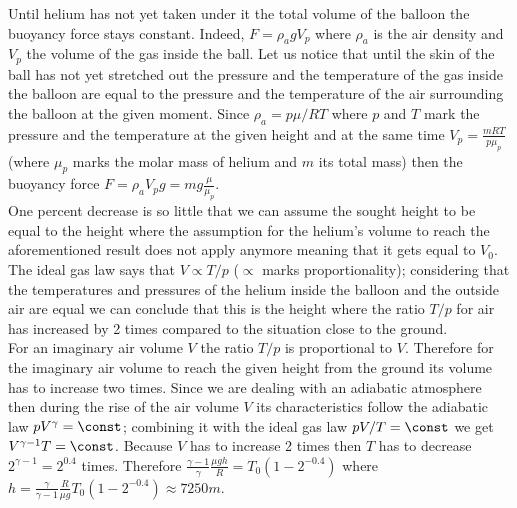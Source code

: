 \documentclass[11pt]{article}
\begin{document}

\solueng
Until helium has not yet taken under it the total volume of the balloon the buoyancy force stays constant. Indeed, $F=\rho_a g V_p$ where $\rho_a$ is the air density and $V_p$ the volume of the gas inside the ball. Let us notice that until the skin of the ball has not yet stretched out the pressure and the temperature of the gas inside the balloon are equal to the pressure and the temperature of the air surrounding the balloon at the given moment. Since $\rho_a=p\mu/RT$ where $p$ and $T$ mark the pressure and the temperature at the given height and at the same time $V_p=\frac {mRT}{p\mu_p}$ (where $\mu_p$ marks the molar mass of helium and $m$ its total mass) then the buoyancy force $F=\rho_a V_p g=mg\frac{\mu}{\mu_p}$.\\
One percent decrease is so little that we can assume the sought height to be equal to the height where the assumption for the helium’s volume to reach the aforementioned result does not apply anymore meaning that it gets equal to $V_0$. The ideal gas law says that $V\propto T/p$ ($\propto$ marks proportionality); considering that the temperatures and pressures of the helium inside the balloon and the outside air are equal we can conclude that this is the height where the ratio $T/p$ for air has increased by 2 times compared to the situation close to the ground.\\
For an imaginary air volume $V$ the ratio $T/p$ is proportional to $V$. Therefore for the imaginary air volume to reach the given height from the ground its volume has to increase two times. Since we are dealing with an adiabatic atmosphere then during the rise of the air volume $V$ its characteristics follow the adiabatic law $pV^\gamma=\const$; combining it with the ideal gas law $pV/T=\const$ we get $V^{\gamma-1}T=\const$. Because $V$ has to increase 2 times then $T$ has to decrease $2^{\gamma-1}=2^{0.4}$ times. Therefore $\frac{\gamma-1}\gamma\frac{\mu g h}R =T_0(1-2^{-0.4})$ where $h=\frac\gamma{\gamma-1}\frac R{\mu g}T_0(1-2^{-0.4})\approx\SI{7250}m$.
\probend
\bigskip

\end{document}
